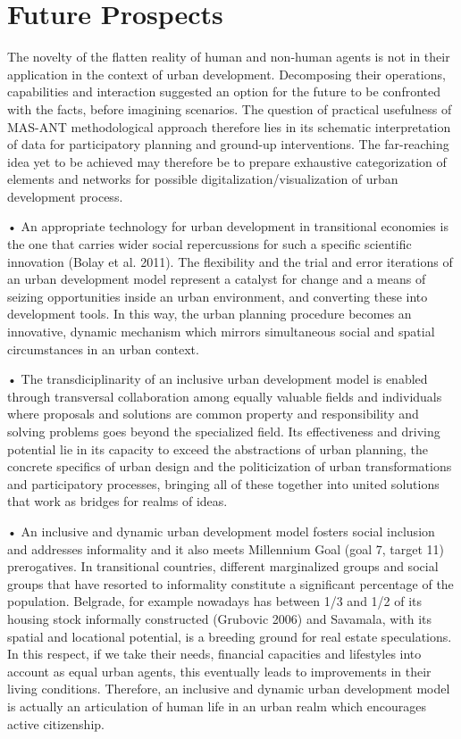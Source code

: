 \documentclass[11pt]{report}
\begin{document}
\section{Future Prospects}

The novelty of the flatten reality of human and non-human agents is not in their application in the context of urban development. Decomposing their operations, capabilities and interaction suggested an option for the future to be confronted with the facts, before imagining scenarios. The question of practical usefulness of MAS-ANT methodological approach therefore lies in its schematic interpretation of data for participatory planning and ground-up interventions. The far-reaching idea yet to be achieved may therefore be to prepare exhaustive categorization of elements and networks for possible digitalization/visualization of urban development process.

•	An appropriate technology for urban development in transitional economies is the one that carries wider social repercussions for such a specific scientific innovation (Bolay et al. 2011). The flexibility and the trial and error iterations of an urban development model represent a catalyst for change and a means of seizing opportunities inside an urban environment, and converting these into development tools. In this way, the urban planning procedure becomes an innovative, dynamic mechanism which mirrors simultaneous social and spatial circumstances in an urban context.

•	The transdiciplinarity of an inclusive urban development model is enabled through transversal collaboration among equally valuable fields and individuals where proposals and solutions are common property and responsibility and solving problems goes beyond the specialized field. Its effectiveness and driving potential lie in its capacity to exceed the abstractions of urban planning, the concrete specifics of urban design and the politicization of urban transformations and participatory processes,  bringing all of these together  into united solutions that work as bridges for realms of ideas.

•	An inclusive and dynamic urban development model fosters social inclusion and addresses informality and it also meets Millennium Goal (goal 7, target 11) prerogatives. In transitional countries, different marginalized groups and social groups that have resorted to informality constitute a significant percentage of the population. Belgrade, for example nowadays has between 1/3 and 1/2 of its housing stock informally constructed (Grubovic 2006) and Savamala, with its spatial and locational potential, is a breeding ground for real estate speculations. In this respect, if we take their needs, financial capacities and lifestyles into account as equal urban agents, this eventually leads to improvements in their living conditions. Therefore, an inclusive and dynamic urban development model is actually an articulation of human life in an urban realm which encourages active citizenship.


\begin{small}

\end{small}



\newpage
\appendix
\noappendicestocpagenum
\addappheadtotoc
\end{document}
